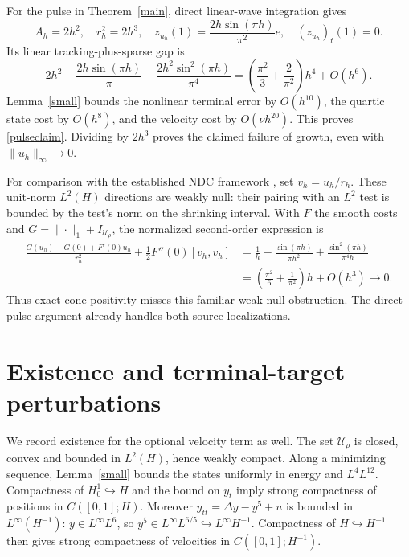 \documentclass[11pt]{article}
\newcommand{\U}{\mathcal U_\rho}
\newcommand{\norm}[1]{\lVert #1\rVert}
\begin{document}
For the pulse in Theorem~\ref{main}, direct linear-wave integration gives
\begin{equation}\label{pulse}
 A_h=2h^2,\quad r_h^2=2h^3,\quad
 z_{u_h}(1)=\frac{2h\sin(\pi h)}{\pi^2}e,\quad
 (z_{u_h})_t(1)=0.
\end{equation}
Its linear tracking-plus-sparse gap is
\[
 2h^2-\frac{2h\sin(\pi h)}\pi
       +\frac{2h^2\sin^2(\pi h)}{\pi^4}
 =\left(\frac{\pi^2}{3}+\frac2{\pi^2}\right)h^4+O(h^6).
\]
Lemma~\ref{small} bounds the nonlinear terminal error by $O(h^{10})$,
the quartic state cost by $O(h^8)$, and the velocity cost by
$O(\nu h^{20})$. This proves \eqref{pulseclaim}. Dividing by $2h^3$
proves the claimed failure of growth, even with $\norm{u_h}_\infty\to0$.

For comparison with the established NDC framework \cite{CW,BW}, set
$v_h=u_h/r_h$. These unit-norm $L^2(H)$ directions are weakly null:
their pairing with an $L^2$ test is bounded by the test's norm on the
shrinking interval. With $F$ the smooth costs and
$G=\norm{\cdot}_1+I_{\U}$, the normalized second-order expression is
\begin{align*}
 \frac{G(u_h)-G(0)+F'(0)u_h}{r_h^2}
   +\tfrac12 F''(0)[v_h,v_h]
 &=\frac1h-\frac{\sin(\pi h)}{\pi h^2}
                      +\frac{\sin^2(\pi h)}{\pi^4h}\\
 &=\left(\frac{\pi^2}{6}+\frac1{\pi^2}\right)h+O(h^3)\to0.
\end{align*}
Thus exact-cone positivity misses this familiar weak-null obstruction.
The direct pulse argument already handles both source localizations.

\section{Existence and terminal-target perturbations}

We record existence for the optional velocity term as well. The set $\U$
is closed, convex and bounded in $L^2(H)$, hence weakly compact. Along a
minimizing sequence, Lemma~\ref{small} bounds the states uniformly in
energy and $L^4L^{12}$. Compactness of $H_0^1\hookrightarrow H$ and the
bound on $y_t$ imply strong compactness of positions in $C([0,1];H)$.
Moreover $y_{tt}=\Delta y-y^5+u$ is bounded in $L^\infty(H^{-1})$:
$y\in L^\infty L^6$, so $y^5\in L^\infty L^{6/5}\hookrightarrow
L^\infty H^{-1}$. Compactness of $H\hookrightarrow H^{-1}$ then gives
strong compactness of velocities in $C([0,1];H^{-1})$.
\end{document}
